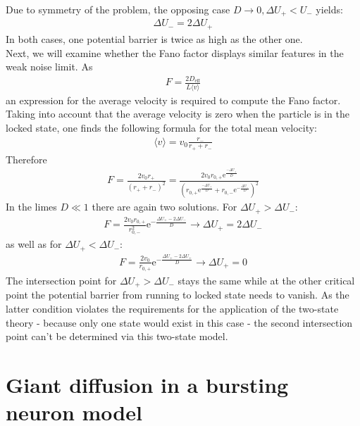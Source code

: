 \documentclass[12pt,a4paper]{article}
\begin{document}
Due to symmetry of the problem, the opposing case $D\rightarrow 0,\Delta U_+<U_-$ yields:
\begin{align*}
\Delta U_-=2\Delta U_+
\end{align*}
In both cases, one potential barrier is twice as high as the other one.\\
Next, we will examine whether the Fano factor displays similar features in the weak noise limit. As 
\begin{align*}
F=\frac{2D_{\text{eff}}}{L\langle v\rangle}
\end{align*}
an expression for the average velocity is required to compute the Fano factor. Taking into account that the average velocity is zero when the particle is in the locked state, one finds the following formula for the total mean velocity:
\begin{align*}
\langle v\rangle=v_0\frac{r_-}{r_++r_-}
\end{align*}
Therefore
\begin{align*}
F=\frac{2v_0r_+}{(r_++r_-)^2}=\frac{2v_0r_{0,+}\text{e}^{\frac{-\Delta U_+}{D}}}{\left(r_{0,+}\text{e}^{\frac{-\Delta U_+}{D}}+r_{0,-}\text{e}^{-\frac{\Delta U_-}{D}}\right)^2}
\end{align*}
In the limes $D\ll1$ there are again two solutions. For $\Delta U_+ > \Delta U_-$:
\begin{align*}
F=\frac{2v_0r_{0,+}}{r_{0,-}^2}\text{e}^{-\frac{\Delta U_+-2\Delta U_-}{D}} \rightarrow \Delta U_+=2\Delta U_-
\end{align*}
as well as for $\Delta U_+ < \Delta U_-$:
\begin{align*}
F=\frac{2v_0}{r_{0,+}}\text{e}^{-\frac{\Delta U_+-2\Delta U_+}{D}} \rightarrow \Delta U_+=0
\end{align*}
The intersection point for $\Delta U_+ > \Delta U_-$ stays the same while at the other critical point the potential barrier from running to locked state needs to vanish. As the latter condition violates the requirements for the application of the two-state theory - because only one state would exist in this case - the second intersection point can't be determined via this two-state model.
\section{Giant diffusion in a bursting neuron model}
\end{document}
